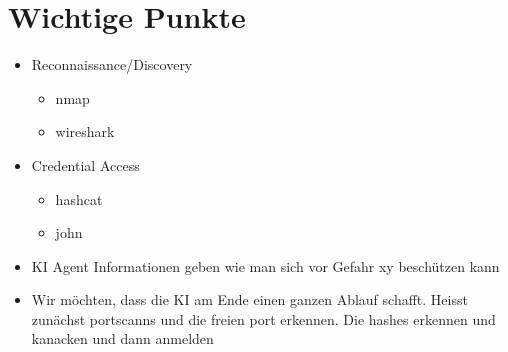 \section{Wichtige Punkte}
\begin{itemize}
	\item Reconnaissance/Discovery
	\begin{itemize}
		\item nmap
		\item wireshark
	\end{itemize}

	\item Credential Access
	\begin{itemize}
		\item hashcat
		\item john
	\end{itemize}

    \item KI Agent Informationen geben wie man sich vor Gefahr xy beschützen kann
    
    \item Wir möchten, dass die KI am Ende einen ganzen Ablauf schafft. Heisst zunächst portscanns und die freien port erkennen. Die hashes erkennen und kanacken und dann anmelden
\end{itemize}